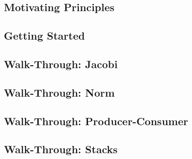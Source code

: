 \label{Language_Overview}

\subsection{Motivating Principles}

\subsection{Getting Started}

\subsection{Walk-Through: Jacobi}

\subsection{Walk-Through: Norm}

\subsection{Walk-Through: Producer-Consumer}

\subsection{Walk-Through: Stacks}
